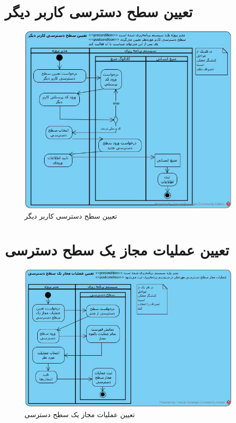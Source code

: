 \section{تعیین سطح دسترسی کاربر دیگر}
\begin{figure}[H]
	\centering
	\includegraphics[scale=0.7]{img/activity/SetUserAccessLevel}
	\caption{تعیین سطح دسترسی کاربر دیگر}
\end{figure}


\section{تعیین عملیات مجاز یک سطح دسترسی}
\begin{figure}[H]
	\centering
	\includegraphics[scale=0.6]{img/activity/SetPermissions}
	\caption{تعیین عملیات مجاز یک سطح دسترسی}
\end{figure}


